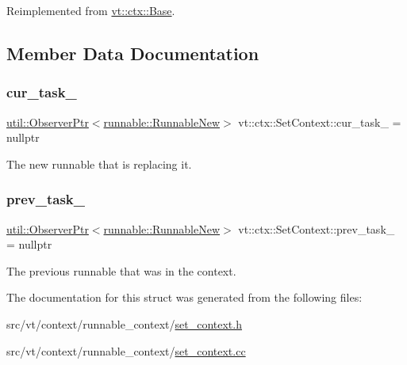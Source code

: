 Reimplemented from \hyperlink{structvt_1_1ctx_1_1_base_a445badaaad72b44313084b2c95a13003}{vt\+::ctx\+::\+Base}.



\subsection{Member Data Documentation}
\mbox{\label{structvt_1_1ctx_1_1_set_context_a54caa513b9c676ccbd100f701f10ba81}} 
\subsubsection{\texorpdfstring{cur\+\_\+task\+\_\+}{cur\_task\_}}
{\footnotesize\ttfamily \hyperlink{namespacevt_1_1util_a7d480434049896696b9a50c38a766202}{util\+::\+Observer\+Ptr}$<$\hyperlink{structvt_1_1runnable_1_1_runnable_new}{runnable\+::\+Runnable\+New}$>$ vt\+::ctx\+::\+Set\+Context\+::cur\+\_\+task\+\_\+ = nullptr\hspace{0.3cm}{\ttfamily [private]}}



The new runnable that is replacing it. 

\mbox{\label{structvt_1_1ctx_1_1_set_context_af5a9e9f7f2f7deeadd17da554e8aa39b}} 
\subsubsection{\texorpdfstring{prev\+\_\+task\+\_\+}{prev\_task\_}}
{\footnotesize\ttfamily \hyperlink{namespacevt_1_1util_a7d480434049896696b9a50c38a766202}{util\+::\+Observer\+Ptr}$<$\hyperlink{structvt_1_1runnable_1_1_runnable_new}{runnable\+::\+Runnable\+New}$>$ vt\+::ctx\+::\+Set\+Context\+::prev\+\_\+task\+\_\+ = nullptr\hspace{0.3cm}{\ttfamily [private]}}



The previous runnable that was in the context. 



The documentation for this struct was generated from the following files\+:\begin{DoxyCompactItemize}
\item 
src/vt/context/runnable\+\_\+context/\hyperlink{set__context_8h}{set\+\_\+context.\+h}\item 
src/vt/context/runnable\+\_\+context/\hyperlink{set__context_8cc}{set\+\_\+context.\+cc}\end{DoxyCompactItemize}
